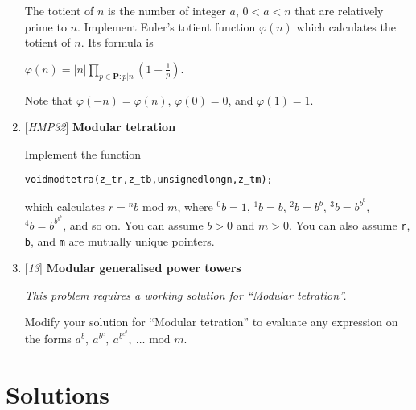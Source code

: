 \begin{enumerate}[label=\textbf{\arabic*}.]
The totient of $n$ is the number of integer $a$,
$0 < a < n$ that are relatively prime to $n$.
Implement Euler's totient function $\varphi(n)$
which calculates the totient of $n$. Its
formula is

\( \displaystyle{
    \varphi(n) = |n| \prod_{p \in \textbf{P} : p | n}
    \left ( 1 - \frac{1}{p} \right ).
}\)

Note that $\varphi(-n) = \varphi(n)$, $\varphi(0) = 0$,
and $\varphi(1) = 1$.



\item {[\textit{HMP32}]} \textbf{Modular tetration}

Implement the function

\vspace{-1em}
\begin{alltt}
   void modtetra(z_t r, z_t b, unsigned long n, z_t m);
\end{alltt}
\vspace{-1em}

\noindent
which calculates $r = {}^n{}b \text{ mod } m$, where
${}^0{}b = 1$, ${}^1{}b = b$, ${}^2{}b = b^b$,
${}^3{}b = b^{b^b}$, ${}^4{}b = b^{b^{b^b}}$, and so on.
You can assume $b > 0$ and $m > 0$. You can also assume
\texttt{r}, \texttt{b}, and \texttt{m} are mutually
unique pointers.



\item {[\textit{13}]} \textbf{Modular generalised power towers}

{\small\textit{This problem requires a working
solution for ``Modular tetration''.}}

Modify your solution for ``Modular tetration'' to
evaluate any expression on the forms
$a^b,~a^{b^c},~a^{b^{c^d}},~\ldots \text{ mod } m$.



\end{enumerate}



\chapter{Solutions}
\label{chap:Solutions}


